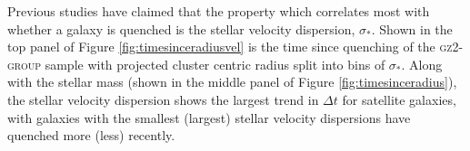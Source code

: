 Previous studies have claimed that the property which correlates most with whether a galaxy is quenched is the stellar velocity dispersion, $\sigma_*$. Shown in the top panel of Figure \ref{fig:timesinceradiusvel} is the time since quenching of the \textsc{gz2-group} sample with projected cluster centric radius split into bins of $\sigma_*$. Along with the stellar mass (shown in the middle panel of Figure \ref{fig:timesinceradius}), the stellar velocity dispersion shows the largest trend in $\Delta t$  for satellite galaxies, with galaxies with the smallest (largest) stellar velocity dispersions have quenched more (less) recently. 

\begin{figure}
\end{figure}
